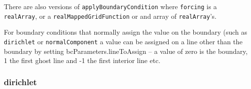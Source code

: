 There are also versions of {\tt applyBoundaryCondition} where {\tt forcing} is a {\tt realArray}, 
or a {\tt real\-Mapped\-Grid\-Function} or and array of {\tt realArray}'s.

 For boundary conditions that normally assign the value on the boundary
(such as {\tt dirichlet} or {\tt normalComponent} a value can be assigned on a line other than the boundary by setting
{\ff bcParameters.lineToAssign} -- a value of zero is the boundary, 1 the first
ghost line and -1 the first interior line etc.


\newcommand{\true}{e.}



\subsubsection{dirichlet}

